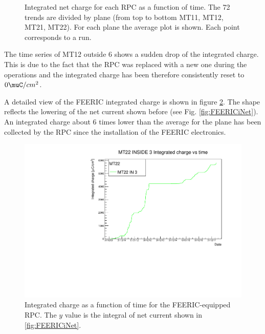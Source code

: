 \begin{figure}[!t]
\begin{center}
\caption{Integrated net charge for each RPC as a function of time. The 72 trends are divided by plane (from top to bottom MT11, MT12, MT21, MT22). For each plane the average plot is shown. Each point corresponds to a run.}
\label{fig:ICharge4Planes}
\end{center}
\end{figure}


The time series of MT12 outside 6 shows a sudden drop of the integrated charge. 
This is due to the fact that the RPC was replaced with a new one during the operations and the integrated charge has been therefore consistently reset to $0\muC/cm^2$.

A detailed view of the FEERIC integrated charge is shown in figure \ref{fig:FEERICIntCharge}.
The shape reflects the lowering of the net current shown before (see Fig. \ref{fig:FEERICiNet}).
An integrated charge about $6$ times lower than the average for the plane has been collected by the RPC since the installation of the FEERIC electronics.

\begin{figure}[!t]
\begin{center}
\includegraphics[width=0.95\linewidth]{Chapters/Performance/Figs/IntChargeFEERIC.pdf}
\caption{Integrated charge as a function of time for the FEERIC-equipped RPC. The $y$ value is the integral of net current shown in \ref{fig:FEERICiNet}.}
\label{fig:FEERICIntCharge}
\end{center}
\end{figure}

